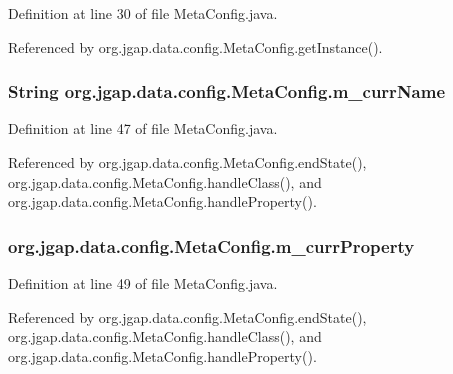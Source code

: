 Definition at line 30 of file Meta\-Config.\-java.



Referenced by org.\-jgap.\-data.\-config.\-Meta\-Config.\-get\-Instance().

\hypertarget{classorg_1_1jgap_1_1data_1_1config_1_1_meta_config_a7a701adbf221113e4e247b43f9fd1dbf}{
\subsubsection[{m\-\_\-curr\-Name}]{\setlength{\rightskip}{0pt plus 5cm}String org.\-jgap.\-data.\-config.\-Meta\-Config.\-m\-\_\-curr\-Name\hspace{0.3cm}{\ttfamily [private]}}}\label{classorg_1_1jgap_1_1data_1_1config_1_1_meta_config_a7a701adbf221113e4e247b43f9fd1dbf}


Definition at line 47 of file Meta\-Config.\-java.



Referenced by org.\-jgap.\-data.\-config.\-Meta\-Config.\-end\-State(), org.\-jgap.\-data.\-config.\-Meta\-Config.\-handle\-Class(), and org.\-jgap.\-data.\-config.\-Meta\-Config.\-handle\-Property().

\hypertarget{classorg_1_1jgap_1_1data_1_1config_1_1_meta_config_a21f4bed08700236ddc9ef5b1cfe78fd5}{
\subsubsection[{m\-\_\-curr\-Property}]{ org.\-jgap.\-data.\-config.\-Meta\-Config.\-m\-\_\-curr\-Property\hspace{0.3cm}{\ttfamily [private]}}}\label{classorg_1_1jgap_1_1data_1_1config_1_1_meta_config_a21f4bed08700236ddc9ef5b1cfe78fd5}


Definition at line 49 of file Meta\-Config.\-java.



Referenced by org.\-jgap.\-data.\-config.\-Meta\-Config.\-end\-State(), org.\-jgap.\-data.\-config.\-Meta\-Config.\-handle\-Class(), and org.\-jgap.\-data.\-config.\-Meta\-Config.\-handle\-Property().

